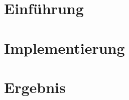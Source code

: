 \documentclass[12pt, a4paper]{book}
\begin{document}
\pagestyle{fancy}






\clearpage
\chapter{Einführung}
\label{chap:einfuehrung}


\chapter{Implementierung}
\label{chap:implementierung}

\clearpage
\label{chap:impl:sph}


\clearpage
\label{chap:impl:accel}

\clearpage
\label{chap:impl:ledcube}

\clearpage

\chapter{Ergebnis}


\clearpage




\clearpage\newpage
{}

\end{document}
